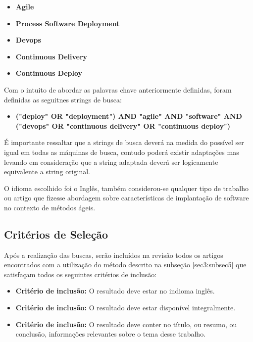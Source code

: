 \documentclass[12pt]{article}
\begin{document}
 \begin{itemize}
   \item  \textbf{Agile}
   \item  \textbf{Process Software Deployment}
   \item  \textbf{Devops}
   \item  \textbf{Continuous Delivery}
   \item  \textbf{Continuous Deploy}
   
 \end{itemize}

Com o intuito de abordar as palavras chave anteriormente definidas, foram definidas as seguitnes strings de busca:

 \begin{itemize}
   \item  \textbf{("deploy" OR "deployment") AND  "agile" AND "software" AND ("devops" OR "continuous delivery" OR "continuous deploy") }
 \end{itemize}

É importante ressaltar que a strings de busca deverá na medida do possível ser igual em todas as máquinas de busca, contudo poderá existir adaptações mas levando em consideração que a string adaptada deverá ser logicamente equivalente a string original.

O idioma escolhido foi o Inglês, também considerou-se qualquer tipo de trabalho ou artigo que fizesse abordagem sobre características de implantação de software no contexto de métodos ágeis.
   
\subsection{Critérios de Seleção} \label{sec3:subsec4}

Após a realização das buscas, serão incluídos na revisão todos os artigos encontrados com a utilização do método descrito na subseção \ref{sec3:subsec5} que satisfaçam todos os seguintes critérios de inclusão:

 \begin{itemize}
   \item  \textbf{Critério de inclusão:} O resultado deve estar no indioma inglês.
   \item  \textbf{Critério de inclusão:} O resultado deve estar disponível integralmente.    
   \item  \textbf{Critério de inclusão:} O resultado deve conter no título, ou resumo, ou conclusão,  informações relevantes sobre o tema desse trabalho.
 \end{itemize}
 
\end{document}
